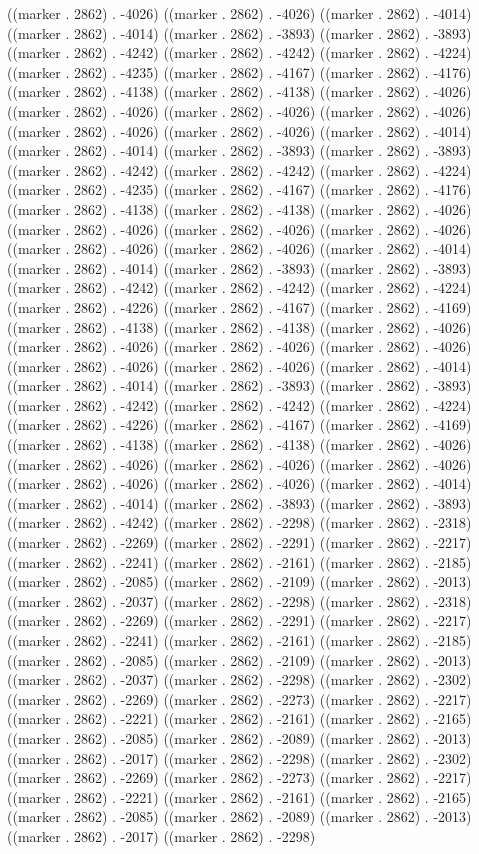 ((marker . 2862) . -4026) ((marker . 2862) . -4026) ((marker . 2862) . -4014) ((marker . 2862) . -4014) ((marker . 2862) . -3893) ((marker . 2862) . -3893) ((marker . 2862) . -4242) ((marker . 2862) . -4242) ((marker . 2862) . -4224) ((marker . 2862) . -4235) ((marker . 2862) . -4167) ((marker . 2862) . -4176) ((marker . 2862) . -4138) ((marker . 2862) . -4138) ((marker . 2862) . -4026) ((marker . 2862) . -4026) ((marker . 2862) . -4026) ((marker . 2862) . -4026) ((marker . 2862) . -4026) ((marker . 2862) . -4026) ((marker . 2862) . -4014) ((marker . 2862) . -4014) ((marker . 2862) . -3893) ((marker . 2862) . -3893) ((marker . 2862) . -4242) ((marker . 2862) . -4242) ((marker . 2862) . -4224) ((marker . 2862) . -4235) ((marker . 2862) . -4167) ((marker . 2862) . -4176) ((marker . 2862) . -4138) ((marker . 2862) . -4138) ((marker . 2862) . -4026) ((marker . 2862) . -4026) ((marker . 2862) . -4026) ((marker . 2862) . -4026) ((marker . 2862) . -4026) ((marker . 2862) . -4026) ((marker . 2862) . -4014) ((marker . 2862) . -4014) ((marker . 2862) . -3893) ((marker . 2862) . -3893) ((marker . 2862) . -4242) ((marker . 2862) . -4242) ((marker . 2862) . -4224) ((marker . 2862) . -4226) ((marker . 2862) . -4167) ((marker . 2862) . -4169) ((marker . 2862) . -4138) ((marker . 2862) . -4138) ((marker . 2862) . -4026) ((marker . 2862) . -4026) ((marker . 2862) . -4026) ((marker . 2862) . -4026) ((marker . 2862) . -4026) ((marker . 2862) . -4026) ((marker . 2862) . -4014) ((marker . 2862) . -4014) ((marker . 2862) . -3893) ((marker . 2862) . -3893) ((marker . 2862) . -4242) ((marker . 2862) . -4242) ((marker . 2862) . -4224) ((marker . 2862) . -4226) ((marker . 2862) . -4167) ((marker . 2862) . -4169) ((marker . 2862) . -4138) ((marker . 2862) . -4138) ((marker . 2862) . -4026) ((marker . 2862) . -4026) ((marker . 2862) . -4026) ((marker . 2862) . -4026) ((marker . 2862) . -4026) ((marker . 2862) . -4026) ((marker . 2862) . -4014) ((marker . 2862) . -4014) ((marker . 2862) . -3893) ((marker . 2862) . -3893) ((marker . 2862) . -4242) ((marker . 2862) . -2298) ((marker . 2862) . -2318) ((marker . 2862) . -2269) ((marker . 2862) . -2291) ((marker . 2862) . -2217) ((marker . 2862) . -2241) ((marker . 2862) . -2161) ((marker . 2862) . -2185) ((marker . 2862) . -2085) ((marker . 2862) . -2109) ((marker . 2862) . -2013) ((marker . 2862) . -2037) ((marker . 2862) . -2298) ((marker . 2862) . -2318) ((marker . 2862) . -2269) ((marker . 2862) . -2291) ((marker . 2862) . -2217) ((marker . 2862) . -2241) ((marker . 2862) . -2161) ((marker . 2862) . -2185) ((marker . 2862) . -2085) ((marker . 2862) . -2109) ((marker . 2862) . -2013) ((marker . 2862) . -2037) ((marker . 2862) . -2298) ((marker . 2862) . -2302) ((marker . 2862) . -2269) ((marker . 2862) . -2273) ((marker . 2862) . -2217) ((marker . 2862) . -2221) ((marker . 2862) . -2161) ((marker . 2862) . -2165) ((marker . 2862) . -2085) ((marker . 2862) . -2089) ((marker . 2862) . -2013) ((marker . 2862) . -2017) ((marker . 2862) . -2298) ((marker . 2862) . -2302) ((marker . 2862) . -2269) ((marker . 2862) . -2273) ((marker . 2862) . -2217) ((marker . 2862) . -2221) ((marker . 2862) . -2161) ((marker . 2862) . -2165) ((marker . 2862) . -2085) ((marker . 2862) . -2089) ((marker . 2862) . -2013) ((marker . 2862) . -2017) ((marker . 2862) . -2298) 